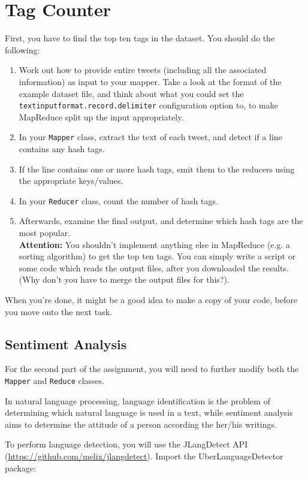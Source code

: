 \documentclass[a4paper,10pt]{article}
\begin{document}
  \section{Tag Counter}

  First, you have to find the top ten tags in the dataset. You should do the following:
  
  \begin{enumerate}
	  \item Work out how to provide entire tweets (including all the associated information) as input to your mapper.
		  Take a look at the format of the example dataset file, and think about what you could set the
		  \texttt{textinputformat.record.delimiter} configuration option to, to make MapReduce split up the input appropriately.
    \item In your \texttt{Mapper} class, extract the text of each tweet, and detect if a line contains any hash tags.
    \item If the line contains one or more hash tags, emit them to the reducers using the appropriate keys/values.
    \item In your \texttt{Reducer} class, count the number of hash tags.
    \item Afterwards, examine the final output, and determine which hash tags are the most popular.\\
    \textbf{Attention:} You shouldn't implement anything else in MapReduce (e.g. a sorting algorithm) to get the top ten tags. You can simply write a script or some code which reads the output files, after you downloaded the results. (Why don't you have to merge the output files for this?).
  \end{enumerate}

  When you're done, it might be a good idea to make a copy of your code, before you move onto the next task.

  \subsection{Sentiment Analysis}
  For the second part of the assignment, you will need to further modify both the \texttt{Mapper} and \texttt{Reduce} classes.

  In natural language processing, language identification is the problem of determining which natural language is used in a text, while sentiment analysis aims to determine the attitude of a person according the her/his writings.   
  
  To perform language detection, you will use the JLangDetect API (\url{https://github.com/melix/jlangdetect}). Import the UberLanguageDetector package: 
  
\end{document}
